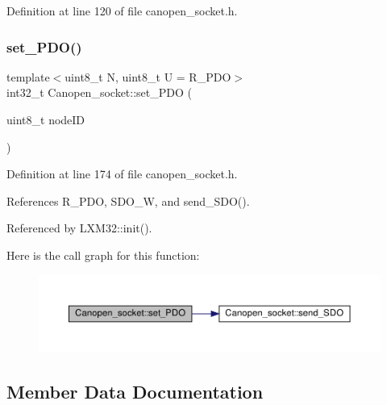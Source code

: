 Definition at line 120 of file canopen\+\_\+socket.\+h.

\mbox{\label{class_canopen__socket_aa3cb0686ca837db520281613741e5776}} 
\subsubsection{\texorpdfstring{set\+\_\+\+P\+D\+O()}{set\_PDO()}}
{\footnotesize\ttfamily template$<$uint8\+\_\+t N, uint8\+\_\+t U = R\+\_\+\+P\+DO$>$ \\
int32\+\_\+t Canopen\+\_\+socket\+::set\+\_\+\+P\+DO (\begin{DoxyParamCaption}\item[{uint8\+\_\+t}]{node\+ID }\end{DoxyParamCaption})\hspace{0.3cm}{\ttfamily [inline]}}



Definition at line 174 of file canopen\+\_\+socket.\+h.



References R\+\_\+\+P\+DO, S\+D\+O\+\_\+W, and send\+\_\+\+S\+D\+O().



Referenced by L\+X\+M32\+::init().

Here is the call graph for this function\+:\nopagebreak
\begin{figure}[H]
\begin{center}
\leavevmode
\includegraphics[width=350pt]{class_canopen__socket_aa3cb0686ca837db520281613741e5776_cgraph}
\end{center}
\end{figure}


\subsection{Member Data Documentation}
\mbox{\label{class_canopen__socket_a5a97bd26a92fb94c9a662e30c7d4a490}} 
